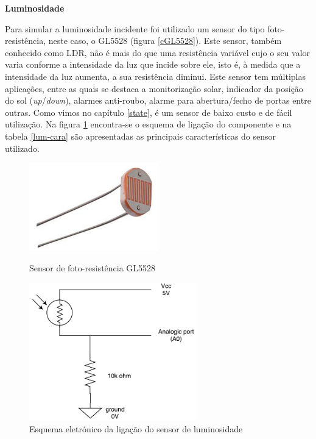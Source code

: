 \textbf{Luminosidade}



Para simular a luminosidade incidente foi utilizado um sensor do tipo foto-resistência, neste caso, o GL5528 (figura \ref{cGL5528}). Este sensor, também conhecido como \ac{LDR}, não é mais do que uma resistência variável cujo o seu valor varia conforme a intensidade da luz que incide sobre ele, isto é, à medida que a intensidade da luz aumenta, a sua resistência diminui. Este sensor tem múltiplas aplicações, entre as quais se destaca a monitorização solar, indicador da posição do sol (\textit{up}/\textit{down}), alarmes anti-roubo, alarme para abertura/fecho de portas entre outras. Como vimos no capítulo \ref{state}, é um sensor de baixo custo e de fácil utilização. Na figura \ref{lum-esquema} encontra-se o esquema de ligação do componente e na tabela \ref{lum-cara} são apresentadas as principais características do sensor utilizado. 







\begin{figure}[h]
	\centering
	\begin{minipage}[b]{0.49\textwidth}
		\centering
		\includegraphics[width=0.5\textwidth]{img/hardware/luminosidade.png}
		\caption{Sensor de foto-resistência GL5528}
		\label{cGL5528}
	\end{minipage}
	\hfill
	\begin{minipage}[b]{0.49\textwidth}
		\centering
		\includegraphics[width=0.65\textwidth]{img/hardware/lumi_esquema.pdf}
		\caption{Esquema eletrónico da ligação do sensor de luminosidade}
		\label{lum-esquema}
	\end{minipage}
\end{figure}







